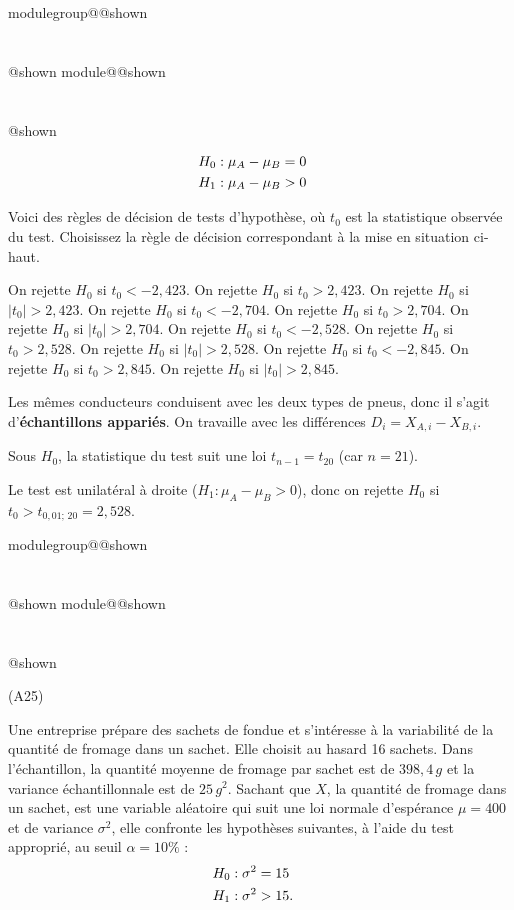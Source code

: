 \documentclass{Evaluation}
\makeatletter
\newcommand{\currentmodulekey}{}
\newcommand{\currentmoduletitle}{}
\newcommand{\currentgroupkey}{}
\newcommand{\currentgrouptitle}{}
\newcommand{\showmoduleifneeded}{%
  \ifx\currentgroupkey\empty\else
    \expandafter\ifx\csname modulegroup@\currentgroupkey @shown\endcsname\relax
      \section*{\currentgrouptitle}%
      \expandafter\gdef\csname modulegroup@\currentgroupkey @shown\endcsname{1}%
    \fi
  \fi
  \expandafter\ifx\csname module@\currentmodulekey @shown\endcsname\relax
    \section*{\currentmoduletitle}%
    \expandafter\gdef\csname module@\currentmodulekey @shown\endcsname{1}%
  \fi
}
\newenvironment{A25}{\showmoduleifneeded}{}
\makeatother
\begin{document}
\begin{questions}
\begin{A25}
\begin{align*}
    H_0&:\mu_{A} - \mu_{B} = 0 \cr
    H_1&:\mu_{A} - \mu_{B} > 0
\end{align*}

Voici des règles de décision de tests d'hypothèse, où $t_0$ est la statistique observée du test. Choisissez la règle de décision correspondant à la mise en situation ci-haut.

\begin{checkboxes}
    \choice On rejette $H_0$ si $t_0 < -2,423$.
    \choice On rejette $H_0$ si $t_0 > 2,423$.
    \choice On rejette $H_0$ si $|t_0| > 2,423$.
    \choice On rejette $H_0$ si $t_0 < -2,704$.
    \choice On rejette $H_0$ si $t_0 > 2,704$.
    \choice On rejette $H_0$ si $|t_0| > 2,704$.
    \choice On rejette $H_0$ si $t_0 < -2,528$.
    \correctchoice On rejette $H_0$ si $t_0 > 2,528$.
    \choice On rejette $H_0$ si $|t_0| > 2,528$.
    \choice On rejette $H_0$ si $t_0 < -2,845$.
    \choice On rejette $H_0$ si $t_0 > 2,845$.
    \choice On rejette $H_0$ si $|t_0| > 2,845$.
\end{checkboxes}

\begin{solution}
Les mêmes conducteurs conduisent avec les deux types de pneus, donc il s'agit d'\textbf{échantillons appariés}. On travaille avec les différences $D_i = X_{A,i} - X_{B,i}$.

Sous $H_0$, la statistique du test suit une loi $t_{n-1} = t_{20}$ (car $n = 21$).

Le test est unilatéral à droite ($H_1 : \mu_A - \mu_B > 0$), donc on rejette $H_0$ si $t_0 > t_{0{,}01;\,20} = 2{,}528$.
\end{solution}
\end{A25}

\begin{A25}
\question {}\label{1FQCM} (A25)

Une entreprise prépare des sachets de fondue et s'intéresse à la variabilité de la quantité de fromage dans un sachet. Elle choisit au hasard 16 sachets. Dans l'échantillon, la quantité moyenne de fromage par sachet est de $398,4 \,g$ et la variance échantillonnale est de $25 \, g^2$. Sachant que $X$, la quantité de fromage dans un sachet, est une variable aléatoire qui suit une loi normale d'espérance $\mu=400$ et de variance $\sigma^2$, elle confronte les hypothèses suivantes, à l'aide du test approprié, au seuil $\alpha=10\%$ :
\begin{align*}
	H_0 &: \sigma^2 = 15 \cr
	H_1 &: \sigma^2 > 15.
\end{align*}


\end{A25}
\end{questions}
\end{document}
